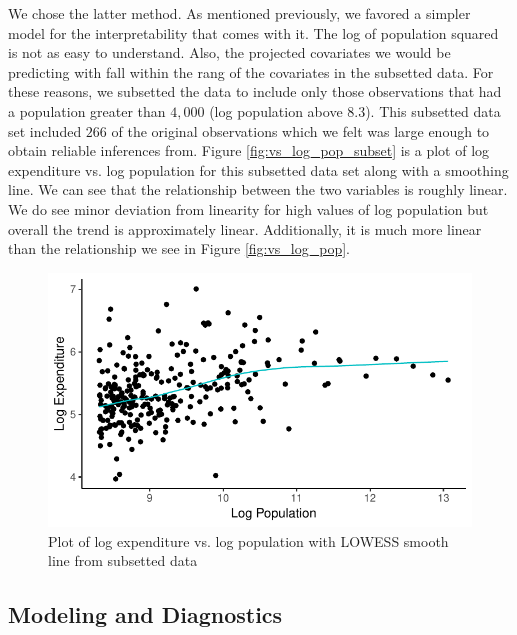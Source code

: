 \documentclass{article}\usepackage[]{graphicx}\usepackage[]{color}
\makeatletter
\def\maxwidth{ %
  \ifdim\Gin@nat@width>\linewidth
    \linewidth
  \else
    \Gin@nat@width
  \fi
}
\newenvironment{knitrout}{}{} %
\makeatother
\begin{document}
We chose the latter method. As mentioned previously, we favored a simpler model for the interpretability that comes with it. The log of population squared is not as easy to understand. Also, the projected covariates we would be predicting with fall within the rang of the covariates in the subsetted data. For these reasons, we subsetted the data to include only those observations that had a population greater than $4,000$ (log population above $8.3$). This subsetted data set included $266$ of the original observations which we felt was large enough to obtain reliable inferences from. Figure \ref{fig:vs_log_pop_subset} is a plot of log expenditure vs. log population for this subsetted data set along with a smoothing line. We can see that the relationship between the two variables is roughly linear. We do see minor deviation from linearity for high values of log population but overall the trend is approximately linear. Additionally, it is much more linear than the relationship we see in Figure \ref{fig:vs_log_pop}.

\begin{knitrout}
\color{fgcolor}\begin{figure}[h]
\includegraphics[width=\maxwidth]{figure/r_fig_vs_log_pop_subset-1} \caption{\label{fig:vs_log_pop_subset} Plot of log expenditure vs. log population with LOWESS smooth line from subsetted data}\label{fig:r fig_vs_log_pop_subset}
\end{figure}


\end{knitrout}

\subsection{Modeling and Diagnostics} \label{modeling}
\end{document}
